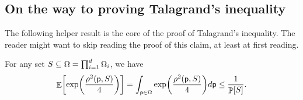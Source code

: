 \subsection{On the way to proving Talagrand's inequality}

The following helper result is the core of the proof of Talagrand's
inequality. The reader might want to skip reading the proof of this
claim, at least at first reading.

\begin{theorem}
    For any set $S \subseteq \Omega = \prod_{i=1}^d \Omega_i$, we
    have
    \begin{equation*}
        \ds \Ex{ \exp \pth{\frac{\distTSqY{\pnt}{\SetA} }{4}}}%
        =%
        \int_{\pnt \in \Omega}\exp \pth{\frac{\distTSqY{\pnt}{\SetA}
           }{4}} d\pnt \leq%
        \frac{1}{\Prob{\SetA}}.
    \end{equation*}                   
\end{theorem}
